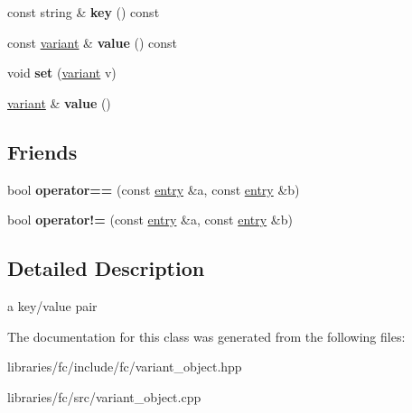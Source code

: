 \begin{DoxyCompactItemize}
\mbox{\label{classfc_1_1variant__object_1_1entry_a0c9975aa4bfbef22a038e0f967714fd8}} 
const string \& {\bfseries key} () const
\item 
\mbox{\label{classfc_1_1variant__object_1_1entry_a9e4a6a38effeda2cc26edfada07fd967}} 
const \mbox{\hyperlink{classfc_1_1variant}{variant}} \& {\bfseries value} () const
\item 
\mbox{\label{classfc_1_1variant__object_1_1entry_a8f932d6b08e11f0448b82ebbcc63f2a3}} 
void {\bfseries set} (\mbox{\hyperlink{classfc_1_1variant}{variant}} v)
\item 
\mbox{\label{classfc_1_1variant__object_1_1entry_ae7a8d609c2f0f421a75aefabfe6951d7}} 
\mbox{\hyperlink{classfc_1_1variant}{variant}} \& {\bfseries value} ()
\end{DoxyCompactItemize}
\subsection*{Friends}
\begin{DoxyCompactItemize}
\item 
\mbox{\label{classfc_1_1variant__object_1_1entry_a756d499107694dde2b63b29f49f4b8a3}} 
bool {\bfseries operator==} (const \mbox{\hyperlink{classfc_1_1variant__object_1_1entry}{entry}} \&a, const \mbox{\hyperlink{classfc_1_1variant__object_1_1entry}{entry}} \&b)
\item 
\mbox{\label{classfc_1_1variant__object_1_1entry_a41bda1520d0b1cf3ccc881119ce39508}} 
bool {\bfseries operator!=} (const \mbox{\hyperlink{classfc_1_1variant__object_1_1entry}{entry}} \&a, const \mbox{\hyperlink{classfc_1_1variant__object_1_1entry}{entry}} \&b)
\end{DoxyCompactItemize}


\subsection{Detailed Description}
a key/value pair 

The documentation for this class was generated from the following files\+:\begin{DoxyCompactItemize}
\item 
libraries/fc/include/fc/variant\+\_\+object.\+hpp\item 
libraries/fc/src/variant\+\_\+object.\+cpp\end{DoxyCompactItemize}
